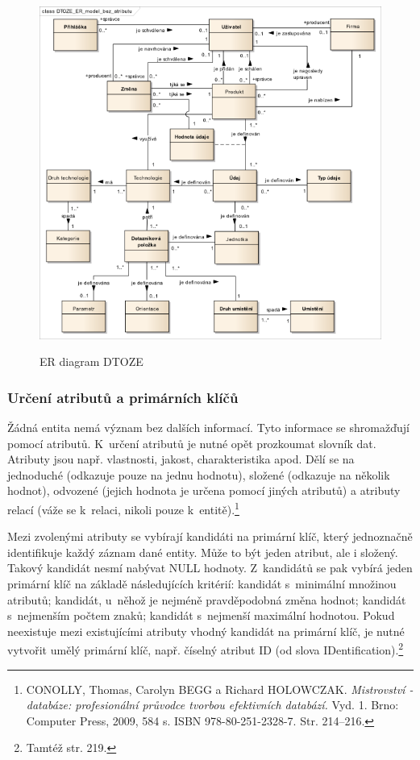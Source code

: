 \documentclass[11pt,a4paper]{article}
\begin{document}
\begin{figure}[H] 
\centering 
\caption{ER diagram DTOZE} 
\vspace{0.1cm}
\includegraphics[scale=0.75]{DTOZE_konc_bezA_n} 
\label{fig:DTOZE_konc_bezA}
\end{figure} 
\newpage

\subsubsection{Určení atributů a primárních klíčů}
Žádná entita nemá význam bez dalších informací. Tyto informace se shromažďují pomocí atributů. K~určení atributů je nutné opět prozkoumat slovník dat. Atributy jsou např. vlastnosti, jakost, charakteristika apod. Dělí se na jednoduché (odkazuje pouze na jednu hodnotu), složené (odkazuje na několik hodnot), odvozené (jejich hodnota je určena pomocí jiných atributů) a atributy relací (váže se k~relaci, nikoli pouze k~entitě).\footnote{CONOLLY, Thomas, Carolyn BEGG a Richard HOLOWCZAK. \textit{Mistrovství - databáze: profesionální průvodce tvorbou efektivních databází.} Vyd. 1. Brno: Computer Press, 2009, 584 s. ISBN 978-80-251-2328-7. Str. 214–216.}  

Mezi zvolenými atributy se vybírají kandidáti na primární klíč, který jednoznačně identifikuje každý záznam dané entity. Může to být jeden atribut, ale i složený. Takový kandidát nesmí nabývat NULL hodnoty. Z~kandidátů se pak vybírá jeden primární klíč na základě následujících kritérií: kandidát s~minimální množinou atributů; kandidát, u~něhož je nejméně pravděpodobná změna hodnot; kandidát s~nejmenším počtem znaků; kandidát s~nejmenší maximální hodnotou. Pokud neexistuje mezi existujícími atributy vhodný kandidát na primární klíč, je nutné vytvořit umělý primární klíč, např. číselný atribut ID (od slova IDentification).\footnote{Tamtéž str. 219.} 
\end{document}
